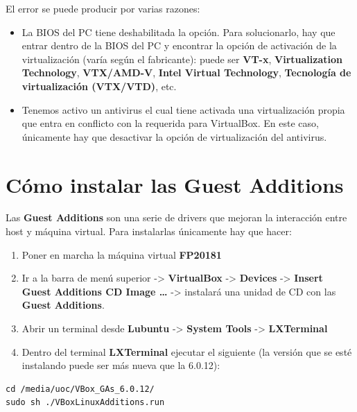 \documentclass[
]{book}
\providecommand{\tightlist}{%
  \setlength{\itemsep}{0pt}\setlength{\parskip}{0pt}}
\begin{document}
El error se puede producir por varias razones:

\begin{itemize}
\tightlist
\item
  La BIOS del PC tiene deshabilitada la opción. Para solucionarlo, hay que entrar dentro de la BIOS del PC y encontrar la opción de activación de la virtualización (varía según el fabricante): puede ser \textbf{VT-x}, \textbf{Virtualization Technology}, \textbf{VTX/AMD-V}, \textbf{Intel Virtual Technology}, \textbf{Tecnología de virtualización (VTX/VTD)}, etc.
\item
  Tenemos activo un antivirus el cual tiene activada una virtualización propia que entra en conflicto con la requerida para VirtualBox. En este caso, únicamente hay que desactivar la opción de virtualización del antivirus.
\end{itemize}

\hypertarget{cuxf3mo-instalar-las-guest-additions}{%
\section{Cómo instalar las Guest Additions}\label{cuxf3mo-instalar-las-guest-additions}}

Las \textbf{Guest Additions} son una serie de drivers que mejoran la interacción entre host y máquina virtual. Para instalarlas únicamente hay que hacer:

\begin{enumerate}
\def\labelenumi{\arabic{enumi}.}
\tightlist
\item
  Poner en marcha la máquina virtual \textbf{FP20181}
\item
  Ir a la barra de menú superior -\textgreater{} \textbf{VirtualBox} -\textgreater{} \textbf{Devices} -\textgreater{} \textbf{Insert Guest Additions CD Image \ldots{}} -\textgreater{} instalará una unidad de CD con las \textbf{Guest Additions}.
\item
  Abrir un terminal desde \textbf{Lubuntu} -\textgreater{} \textbf{System Tools} -\textgreater{} \textbf{LXTerminal}
\item
  Dentro del terminal \textbf{LXTerminal} ejecutar el siguiente (la versión que se esté instalando puede ser más nueva que la 6.0.12):
\end{enumerate}

\begin{verbatim}
cd /media/uoc/VBox_GAs_6.0.12/     
sudo sh ./VBoxLinuxAdditions.run
\end{verbatim}
\end{document}
